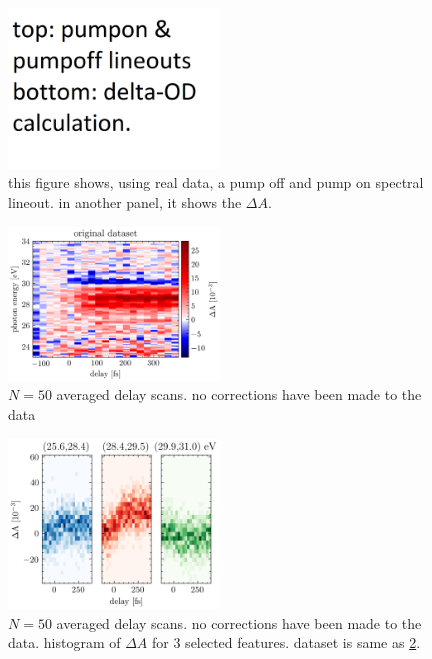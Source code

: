 \begin{figure}
	\centering
	\includegraphics[width=0.5\textwidth]{figures/chap3/PumpOn_vs_PumpOff.png}
	\caption{this figure shows, using real data, a pump off and pump on spectral lineout. in another panel, it shows the $\Delta A$.}
	\label{fig:PumpOn_vs_PumpOff}
\end{figure}

\begin{figure}
	\centering
	\includegraphics[width=0.5\textwidth]{figures/chap3/Ge_uncorrected_raw_spectrogram.png}
	\caption{$N=50$ averaged delay scans. no corrections have been made to the data}
	\label{fig:Ge_uncorrected_raw_spectrogram}
\end{figure}

\begin{figure}
	\centering
	\includegraphics[width=0.5\textwidth]{figures/chap3/uncorrected_hist.png}
	\caption{$N=50$ averaged delay scans. no corrections have been made to the data. histogram of $\Delta A$ for 3 selected features. dataset is same as \cref{fig:Ge_uncorrected_raw_spectrogram}.}
	\label{fig:uncorrected_hist}
\end{figure}

